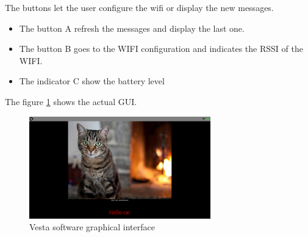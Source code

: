 The buttons let the user configure the wifi or display the new messages.

\begin{itemize}
\item{The button A refresh the messages and display the last one.}
\item{The button B goes to the WIFI configuration and indicates the RSSI of the WIFI.}
\item{The indicator C show the battery level}
\end{itemize}

The figure \ref{fig:graphical interface} shows the actual GUI.

\begin{figure}[!htb]
    \centering
    \includegraphics[width=0.7\textwidth,keepaspectratio]{chap/softFig/vesta_printscreen}
    \caption{Vesta software graphical interface}
    \label{fig:graphical interface}
\end{figure}
